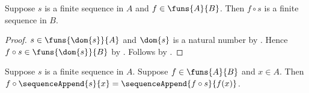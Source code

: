 \begin{proposition}\label{monoid_map_finite_sequence}
    Suppose $s$ is a finite sequence in $A$ and $f\in\funs{A}{B}$.
    Then $f\circ s$ is a finite sequence in $B$.
\end{proposition}
\begin{proof}
    $s\in\funs{\dom{s}}{A}$ and $\dom{s}$ is a natural number by
        .
    Hence $f\circ s\in\funs{\dom{s}}{B}$ by .
    Follows by .
\end{proof}

\begin{proposition}\label{monoid_map_sequence_append}
    Suppose $s$ is a finite sequence in $A$.
    Suppose $f\in\funs{A}{B}$ and $x\in A$.
    Then
        $f\circ\sequenceAppend{s}{x}
            =\sequenceAppend{f\circ s}{f(x)}$.
\end{proposition}

